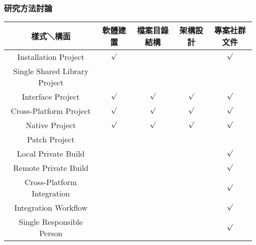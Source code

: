 \documentclass[utf8x]{beamer}
\begin{document}
\begin{frame}
\frametitle{研究方法討論}
\begin{table}[!htbp]
\fontsize{9pt}{10pt}\selectfont
	\setlength{\abovecaptionskip}{0pt}
	\setlength{\belowcaptionskip}{10pt}
	\begin{center}
\begin{tabular}[width=\textwidth]{|c|c|c|c|c|}
\hline
樣式＼構面&軟體建置&檔案目錄結構&架構設計&專案社群文件\\
\hline
Installation Project&${\surd}$&&&${\surd}$\\
\hline
Single Shared Library Project&&&&\\
\hline
Interface Project&${\surd}$&${\surd}$&${\surd}$&${\surd}$\\
\hline
Cross-Platform Project&${\surd}$&${\surd}$&${\surd}$&${\surd}$\\
\hline
Native Project&${\surd}$&${\surd}$&${\surd}$&${\surd}$\\
\hline
Patch Project&&&&\\
\hline
Local Private Build&&&&${\surd}$\\
\hline
Remote Private Build&&&&${\surd}$\\
\hline
Cross-Platform Integration&&&&${\surd}$\\
\hline
Integration Workflow&&&&${\surd}$\\
\hline
Single Responsible Person&&&&${\surd}$\\
\hline
\end{tabular}
\end{center}
\end{table}
\end{frame}

\end{document}

